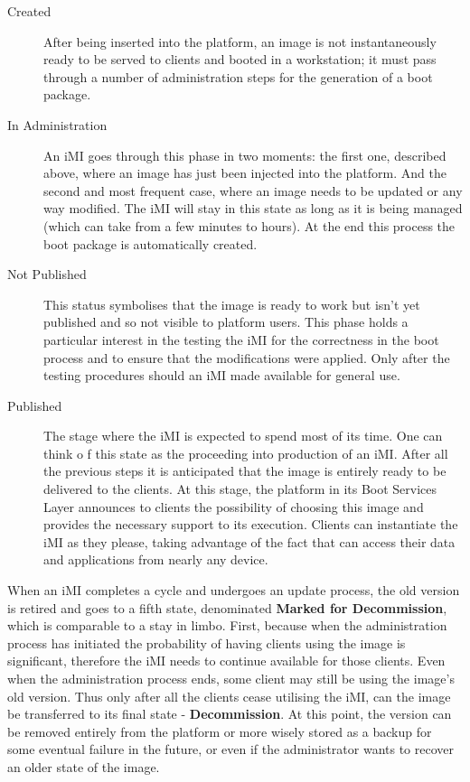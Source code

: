 \begin{description}
	\item [Created] After being inserted into the platform, an image is not instantaneously  ready to be served to clients and booted in a workstation; it must pass through a number of administration steps for the generation of a boot package.
	\item [In Administration] An iMI goes through this phase in two moments: the first one, described above, where an image has just been injected into the platform. And the second and most frequent case, where an image needs to be updated or any way modified. 
	The iMI will stay in this state as long as it is being managed (which can take from a few minutes to hours). At the end this process the boot package is automatically created.
	\item [Not Published] This status symbolises that the image is ready to work but isn't yet published and so not visible to platform users. This phase holds a particular interest in the testing the iMI for the correctness in the boot process and to ensure that the modifications were applied. Only after the testing procedures should an iMI made available for general use.
	\item [Published] The stage where the iMI is expected to spend most of its time. One can think o   f this state as the proceeding into production of an iMI. After all the previous steps it is anticipated that the image is entirely ready to be delivered to the clients. At this stage, the platform in its Boot Services Layer announces to clients the possibility of choosing this image and provides the necessary support to its execution. Clients can instantiate the iMI as they please, taking advantage of the fact that can access their data and applications from nearly any device.
\end{description}

When an iMI completes a cycle and undergoes an update process, the old version is retired and goes to a fifth state, denominated \textbf{Marked for Decommission}, which is comparable to a stay in limbo. First, because when the administration process has initiated the probability of having clients using the image is significant, therefore the iMI needs to continue available for those clients. Even when the administration process ends, some client may still be using the image's old version. Thus only after all the clients cease utilising the iMI, can the image be transferred to its final state - \textbf{Decommission}. At this point, the version can be removed entirely from the platform or more wisely stored as a backup for some eventual failure in the future, or even if the administrator wants to recover an older state of the image.






